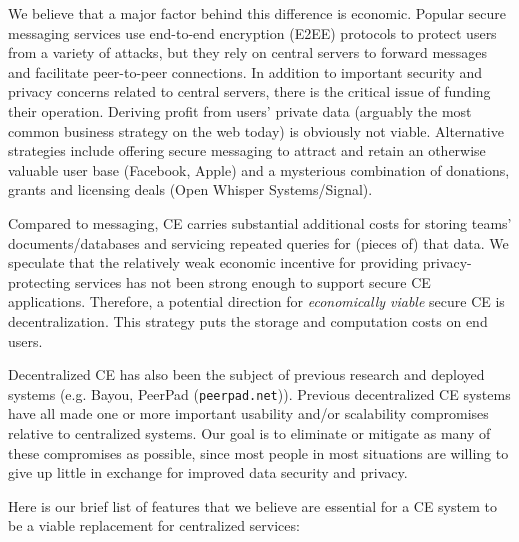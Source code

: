\documentclass[runningheads]{llncs}
\begin{document}

We believe that a major factor behind this difference is economic.
Popular secure messaging services use end-to-end encryption (E2EE) protocols to protect users from a variety of attacks, but they rely on central servers to forward messages and facilitate peer-to-peer connections.
In addition to important security and privacy concerns related to central servers, there is the critical issue of funding their operation.
Deriving profit from users' private data (arguably the most common business strategy on the web today) is obviously not viable.
Alternative strategies include offering secure messaging to attract and retain an otherwise valuable user base (Facebook, Apple) and a mysterious combination of donations, grants and licensing deals (Open Whisper Systems{\slash}Signal).

Compared to messaging, CE carries substantial additional costs for storing teams' documents{\slash}databases and servicing repeated queries for (pieces of) that data.
We speculate that the relatively weak economic incentive for providing privacy-protecting services has not been strong enough to support secure CE applications.
Therefore, a potential direction for \emph{economically viable} secure CE is decentralization.
This strategy puts the storage and computation costs on end users.\footnotemark{}


Decentralized CE has also been the subject of previous research and deployed systems (e.g. Bayou\cite{Terry1995}, PeerPad (\texttt{peerpad.net})).
Previous decentralized CE systems have all made one or more important usability and{\slash}or scalability compromises relative to centralized systems.
Our goal is to eliminate or mitigate as many of these compromises as possible, since most people in most situations are willing to give up little in exchange for improved data security and privacy\cite{Acquisti2013}.

Here is our brief list of features that we believe are essential for a CE system to be a viable replacement for centralized services:
\end{document}

